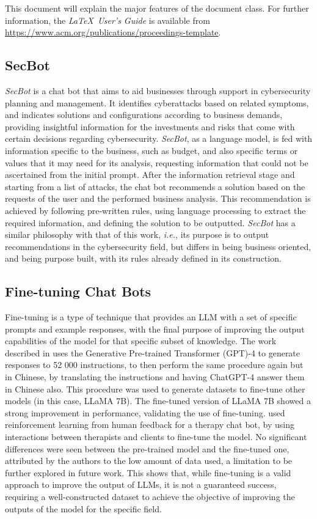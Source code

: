 \documentclass[sigconf]{acmart}
\begin{document}
This document will explain the major features of the document
class. For further information, the {\itshape \LaTeX\ User's Guide} is
available from
\url{https://www.acm.org/publications/proceedings-template}.

\subsection{SecBot}

{\itshape SecBot}  \cite{Franco20, Shaqiri21}  is a chat bot that aims to aid businesses through
support in cybersecurity planning and management. It identifies cyberattacks based on related symptoms, and indicates solutions and
configurations according to business demands, providing insightful information for the investments and risks that come with certain decisions regarding cybersecurity. {\itshape SecBot}, as a language model, is fed
with information specific to the business, such as budget, and also
specific terms or values that it may need for its analysis, requesting
information that could not be ascertained from the initial prompt.
After the information retrieval stage and starting from a list of
attacks, the chat bot recommends a solution based on the requests
of the user and the performed business analysis. This recommendation is achieved by following pre-written rules, using language
processing to extract the required information, and defining the
solution to be outputted. {\itshape SecBot} has a similar philosophy with that
of this work, {\itshape i.e.}, its purpose is to output recommendations in the
cybersecurity field, but differs in being business oriented, and being
purpose built, with its rules already defined in its construction.

\subsection{Fine-tuning Chat Bots}

Fine-tuning is a type of technique that provides an LLM with a set
of specific prompts and example responses, with the final purpose
of improving the output capabilities of the model for that specific
subset of knowledge. The work described in \cite{Peng23} uses the Generative Pre-trained Transformer (GPT)-4 to generate responses to 52
000 instructions, to then perform the same procedure again but
in Chinese, by translating the instructions and having ChatGPT-4
answer them in Chinese also. This procedure was used to generate
datasets to fine-tune other models (in this case, LLaMA 7B). The
fine-tuned version of LLaMA 7B showed a strong improvement
in performance, validating the use of fine-tuning. \cite{Bill23} used reinforcement learning from human feedback for a therapy chat bot, by
using interactions between therapists and clients to fine-tune the
model. No significant differences were seen between the pre-trained
model and the fine-tuned one, attributed by the authors to the low
amount of data used, a limitation to be further explored in future
work. This shows that, while fine-tuning is a valid approach to improve the output of LLMs, it is not a guaranteed success, requiring
a well-constructed dataset to achieve the objective of improving
the outputs of the model for the specific field.
\end{document}
